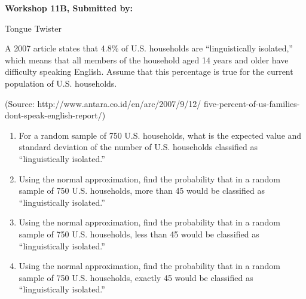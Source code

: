 \documentclass[11pt]{book}\usepackage[]{graphicx}\usepackage[]{color}
\begin{document}
\begin{exercises}
\begin{exercise}
\end{exercise}
\begin{solution}  %

\end{solution}

\clearpage

    \begin{exercise}  %

    \begin{center}
\begin{flushleft}\textbf{\large \hfill Workshop 11B, Submitted by: }\end{flushleft}

\end{center}

Tongue Twister

A 2007 article states that 4.8\% of U.S. households are ``linguistically isolated,'' which means that all members of the household aged 14 years and older have difficulty speaking English.  Assume that this percentage is true for the current population of U.S. households.


 (Source: http://www.antara.co.id/en/arc/2007/9/12/ \newline five-percent-of-us-families-dont-speak-english-report/)


\begin{enumerate}
  \item For a random sample of 750 U.S. households, what is the expected value and standard deviation of the number of U.S. households classified as ``linguistically isolated.''
  \item Using the normal approximation, find the probability that in a random sample of 750 U.S. households, more than 45 would be classified as ``linguistically isolated.''
  \item Using the normal approximation, find the probability that in a random sample of 750 U.S. households, less than 45 would be classified as ``linguistically isolated.''
  \item Using the normal approximation, find the probability that in a random sample of 750 U.S. households, exactly 45 would be classified as ``linguistically isolated.''
\end{enumerate}
\end{exercise}
\begin{solution}  %


\end{solution}
\end{exercises}
\end{document}
